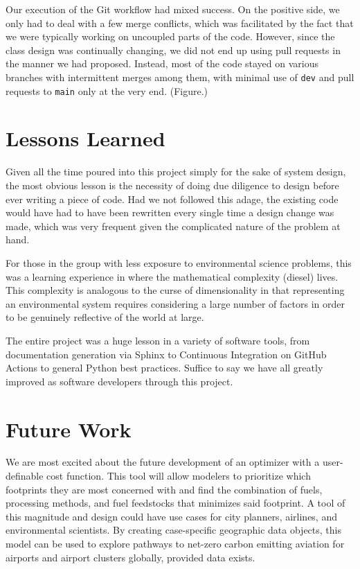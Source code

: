 \documentclass{article}
\begin{document}
Our execution of the Git workflow had mixed success. On the positive side, we only had to deal with a few merge conflicts, which was facilitated by the fact that we were typically working on uncoupled parts of the code. However, since the class design was continually changing, we did not end up using pull requests in the manner we had proposed. Instead, most of the code stayed on various branches with intermittent merges among them, with minimal use of \texttt{dev} and pull requests to \texttt{main} only at the very end. (Figure.)

\section*{Lessons Learned}
Given all the time poured into this project simply for the sake of system design, the most obvious lesson is the necessity of doing due diligence to design before ever writing a piece of code. Had we not followed this adage, the existing code would have had to have been rewritten every single time a design change was made, which was very frequent given the complicated nature of the problem at hand. \par
For those in the group with less exposure to environmental science problems, this was a learning experience in where the mathematical complexity (diesel) lives. This complexity is analogous to the curse of dimensionality in that representing an environmental system requires considering a large number of factors in order to be genuinely reflective of the world at large. 
\par
The entire project was a huge lesson in a variety of software tools, from documentation generation via Sphinx to Continuous Integration on GitHub Actions to general Python best practices. Suffice to say we have all greatly improved as software developers through this project.

\section*{Future Work}

We are most excited about the future development of an optimizer with a user-definable cost function. This tool will allow modelers to prioritize which footprints they are most concerned with and find the combination of fuels, processing methods, and fuel feedstocks that minimizes said footprint. A tool of this magnitude and design could have use cases for city planners, airlines, and environmental scientists. By creating case-specific geographic data objects, this model can be used to explore pathways to net-zero carbon emitting aviation for airports and airport clusters globally, provided data exists.\par
\end{document}
